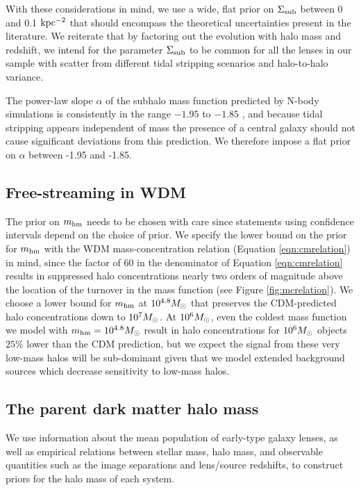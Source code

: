 With these considerations in mind, we use a wide, flat prior on $\Sigma_{\rm{sub}}$ between 0 and 0.1 $\rm{kpc^{-2}}$ that should encompass the theoretical uncertainties present in the literature. We reiterate that by factoring out the evolution with halo mass and redshift, we intend for the parameter $\Sigma_{\rm{sub}}$ to be common for all the lenses in our sample with scatter from different tidal stripping scenarios and halo-to-halo variance.

The power-law slope $\alpha$ of the subhalo mass function predicted by N-body simulations is consistently in the range $-1.95$ to $-1.85$ \citep{Springel++08,Fiacconi++16}, and because tidal stripping appears independent of mass the presence of a central galaxy should not cause significant deviations from this prediction. We therefore impose a flat prior on $\alpha$ between -1.95 and -1.85. 

\subsection{Free-streaming in WDM}
\label{ssec:wdmassumptions}
The prior on ${m_{\rm{hm}}}$ needs to be chosen with care since statements using confidence intervals depend on the choice of prior. We specify the lower bound on the prior for ${m_{\rm{hm}}}$ with the WDM mass-concentration relation (Equation \ref{eqn:cmrelation}) in mind, since the factor of 60 in the denominator of Equation \ref{eqn:cmrelation} results in suppressed halo concentrations nearly two orders of magnitude above the location of the turnover in the mass function (see Figure \ref{fig:mcrelation}). We choose a lower bound for ${m_{\rm{hm}}}$ at $10^{4.8} {M_{\odot}}$ that preserves the CDM-predicted halo concentrations down to $10^7 {M_{\odot}}$. At $10^6 {M_{\odot}}$, even the coldest mass function we model with ${m_{\rm{hm}}} = 10^{4.8} {M_{\odot}}$ result in halo concentrations for $10^{6} {M_{\odot}}$ objects $25\%$ lower than the CDM prediction, but we expect the signal from these very low-mass halos will be sub-dominant given that we model extended background sources which decrease sensitivity to low-mass halos. 

\subsection{The parent dark matter halo mass}
We use information about the mean population of early-type galaxy lenses, as well as empirical relations between stellar mass, halo mass, and observable quantities such as the image separations and lens/source redshifts, to construct priors for the halo mass of each system.  

